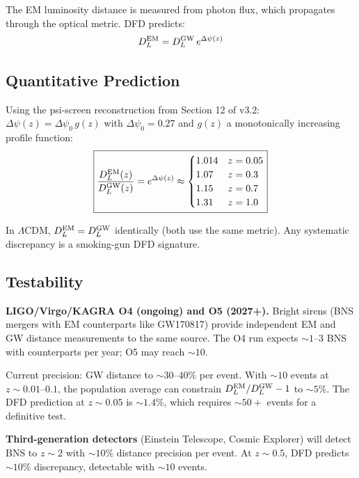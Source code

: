 \documentclass[11pt]{article}
\newcommand{\LCDM}{$\Lambda$CDM}
\begin{document}
The EM luminosity distance is measured from photon flux, which propagates
through the optical metric.  DFD predicts:
\begin{equation}
D_L^{\rm EM} = D_L^{\rm GW}\,e^{\Delta\psi(z)}
\end{equation}

\subsection{Quantitative Prediction}

Using the psi-screen reconstruction from Section 12 of v3.2:
$\Delta\psi(z) = \Delta\psi_0\,g(z)$ with $\Delta\psi_0 = 0.27$ and
$g(z)$ a monotonically increasing profile function:
\begin{equation}
\boxed{
\frac{D_L^{\rm EM}(z)}{D_L^{\rm GW}(z)} = e^{\Delta\psi(z)}
\approx \begin{cases}
1.014 & z = 0.05 \\
1.07  & z = 0.3 \\
1.15  & z = 0.7 \\
1.31  & z = 1.0
\end{cases}
}
\end{equation}

In \LCDM, $D_L^{\rm EM} = D_L^{\rm GW}$ identically (both use the
same metric).  Any systematic discrepancy is a smoking-gun DFD signature.

\subsection{Testability}

\textbf{LIGO/Virgo/KAGRA O4 (ongoing) and O5 (2027+).}
Bright sirens (BNS mergers with EM counterparts like GW170817)
provide independent EM and GW distance measurements to the same
source.  The O4 run expects $\sim 1$--$3$ BNS with counterparts per
year; O5 may reach $\sim 10$.

Current precision: GW distance to $\sim 30$--$40\%$ per event.
With $\sim 10$ events at $z \sim 0.01$--$0.1$, the population average
can constrain $D_L^{\rm EM}/D_L^{\rm GW} - 1$ to $\sim 5\%$.  The DFD
prediction at $z \sim 0.05$ is $\sim 1.4\%$, which requires $\sim 50+$
events for a definitive test.

\textbf{Third-generation detectors} (Einstein Telescope, Cosmic Explorer)
will detect BNS to $z \sim 2$ with $\sim 10\%$ distance precision per
event.  At $z \sim 0.5$, DFD predicts $\sim 10\%$ discrepancy, detectable
with $\sim 10$ events.
\end{document}
